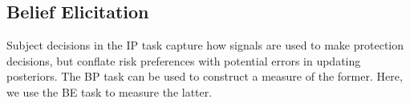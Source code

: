 \documentclass[12pt,a4paper]{article}
\begin{document}
\begin{table}[H]\centering 
\caption{Average Protection by Signal Type} 
\label{tab:nonparIP}
\end{table}



\subsection{Belief Elicitation}
Subject decisions in the IP task capture how signals are used to make protection decisions, but conflate risk preferences with potential errors in updating posteriors.  The BP task can be used to construct a measure of the former. Here, we use the BE task to measure the latter.  


\end{document}
